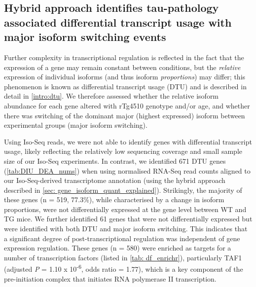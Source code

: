 \clearpage
\subsection{Hybrid approach identifies tau-pathology associated differential transcript usage with major isoform switching events}
Further complexity in transcriptional regulation is reflected in the fact that the expression of a gene may remain constant between conditions, but the \textit{relative} expression of individual isoforms (and thus isoform \textit{proportions}) may differ; this phenomenon is known as differential transcript usage (DTU) and is described in detail in \cref{intro:dtu}. We therefore assessed whether the relative isoform abundance for each gene altered with rTg4510 genotype and/or age, and whether there was switching of the dominant major (highest expressed) isoform between experimental groups (major isoform switching). 

Using Iso-Seq reads, we were not able to identify genes with differential transcript usage, likely reflecting the relatively low sequencing coverage and small sample size of our Iso-Seq experiments. In contrast, we identified 671 DTU genes (\cref{tab:DIU_DEA_nums}) when using normalised RNA-Seq read counts aligned to our Iso-Seq-derived transcriptome annotation (using the hybrid approach described in \cref{sec: gene_isoform_quant_explained}). Strikingly, the majority of these genes (n = 519, 77.3\%), while characterised by a change in isoform proportions, were not differentially expressed at the gene level between WT and TG mice. We further identified 61 genes that were not differentially expressed but were identified with both DTU and major isoform switching. This indicates that a significant degree of post-transcriptional regulation was independent of gene expression regulation. These genes (n = 580) were enriched as targets for a number of transcription factors (listed in \cref{tab: df_enrichr}), particularly TAF1 (adjusted \textit{P} = 1.10 x 10\textsuperscript{-6}, odds ratio = 1.77), which is a key component of the pre-initiation complex that initiates RNA polymerase II transcription\cite{Bieniossek2013}. 

